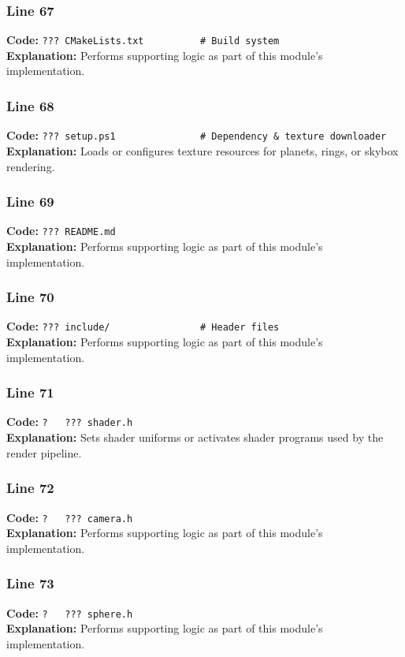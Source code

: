\documentclass[11pt,a4paper]{article}
\begin{document}
\subsubsection*{Line 67}
\textbf{Code:} \verb|??? CMakeLists.txt          # Build system|\\
\textbf{Explanation:} Performs supporting logic as part of this module's implementation.

\subsubsection*{Line 68}
\textbf{Code:} \verb|??? setup.ps1               # Dependency & texture downloader|\\
\textbf{Explanation:} Loads or configures texture resources for planets, rings, or skybox rendering.

\subsubsection*{Line 69}
\textbf{Code:} \verb|??? README.md|\\
\textbf{Explanation:} Performs supporting logic as part of this module's implementation.

\subsubsection*{Line 70}
\textbf{Code:} \verb|??? include/                # Header files|\\
\textbf{Explanation:} Performs supporting logic as part of this module's implementation.

\subsubsection*{Line 71}
\textbf{Code:} \verb|?   ??? shader.h|\\
\textbf{Explanation:} Sets shader uniforms or activates shader programs used by the render pipeline.

\subsubsection*{Line 72}
\textbf{Code:} \verb|?   ??? camera.h|\\
\textbf{Explanation:} Performs supporting logic as part of this module's implementation.

\subsubsection*{Line 73}
\textbf{Code:} \verb|?   ??? sphere.h|\\
\textbf{Explanation:} Performs supporting logic as part of this module's implementation.
\end{document}
